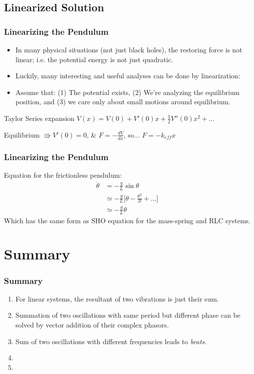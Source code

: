 \documentclass[pdf,hideothersubsections]{beamer}
\begin{document}
\subsection{Linearized Solution}
\begin{frame}
\frametitle{Linearizing the Pendulum}
\begin{itemize}
\item In many physical situations (not just black holes), the restoring force is not linear; i.e. the potential energy is not just quadratic.
\pause
\item Luckily, many interesting and useful analyses can be done by linearization:
\pause
\item Assume that: (1) The potential exists, (2) We're analyzing the equilibrium position, and (3) we care only about small motions around equilibrium.
\end{itemize}
\pause

\begin{block}{Taylor Series expansion} 
$V(x) = V(0) + V'(0) x + \frac{1}{2} V''(0) x^2 + \ldots$
\end{block}
\pause

Equilibrium $\Rrightarrow V'(0) = 0$, \& $F = -\frac{dV}{dx}$, so...
\pause
$F = - k_{eff} x$

\end{frame}


\begin{frame}
\frametitle{Linearizing the Pendulum}
Equation for the frictionless pendulum:
\begin{align*}
\ddot{\theta} &= -\frac{g}{L} \sin{\theta} \\
              &\simeq -\frac{g}{L} \Big[\theta - \frac{\theta^3}{3 !} + \ldots \Big] \\
              &\simeq -\frac{g}{L} \theta
\end{align*}
\pause
Which has the same form as SHO equation for the mass-spring and RLC systems.


\end{frame}

\section{Summary}
\begin{frame}
\frametitle{Summary}
\begin{enumerate}
\item For linear systems, the resultant of two vibrations is just their sum.
\pause
\item Summation of two oscillations with same period but different phase can be solved by vector addition of their complex phasors.
\pause
\item Sum of two oscillations with different frequencies leads to \emph{beats}.
\pause
\item 
\pause
\item 
\end{enumerate}
\end{frame}
\end{document}
